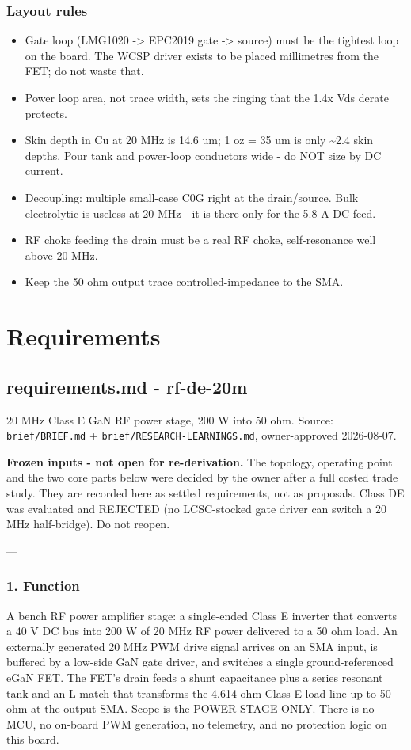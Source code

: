 \documentclass[11pt,a4paper]{article}
\begin{document}
\subsubsection*{Layout rules}
\begin{itemize}
\item Gate loop (LMG1020 -\textgreater{} EPC2019 gate -\textgreater{} source) must be the tightest loop on the board. The WCSP
driver exists to be placed millimetres from the FET; do not waste that.
\item Power loop area, not trace width, sets the ringing that the 1.4x Vds derate protects.
\item Skin depth in Cu at 20 MHz is 14.6 um; 1 oz = 35 um is only \textasciitilde{}2.4 skin depths. Pour tank and
power-loop conductors wide - do NOT size by DC current.
\item Decoupling: multiple small-case C0G right at the drain/source. Bulk electrolytic is useless at
20 MHz - it is there only for the 5.8 A DC feed.
\item RF choke feeding the drain must be a real RF choke, self-resonance well above 20 MHz.
\item Keep the 50 ohm output trace controlled-impedance to the SMA.
\end{itemize}
\section{Requirements}
\subsection*{requirements.md - rf-de-20m}
20 MHz Class E GaN RF power stage, 200 W into 50 ohm. Source: \texttt{brief/BRIEF.md} + \texttt{brief/RESEARCH-LEARNINGS.md}, owner-approved 2026-08-07.

\textbf{Frozen inputs - not open for re-derivation.} The topology, operating point and the two core parts below were decided by the owner after a full costed trade study. They are recorded here as settled requirements, not as proposals. Class DE was evaluated and REJECTED (no LCSC-stocked gate driver can switch a 20 MHz half-bridge). Do not reopen.

---

\subsubsection*{1. Function}
A bench RF power amplifier stage: a single-ended Class E inverter that converts a 40 V DC bus into 200 W of 20 MHz RF power delivered to a 50 ohm load. An externally generated 20 MHz PWM drive signal arrives on an SMA input, is buffered by a low-side GaN gate driver, and switches a single ground-referenced eGaN FET. The FET's drain feeds a shunt capacitance plus a series resonant tank and an L-match that transforms the 4.614 ohm Class E load line up to 50 ohm at the output SMA. Scope is the POWER STAGE ONLY. There is no MCU, no on-board PWM generation, no telemetry, and no protection logic on this board.
\end{document}
